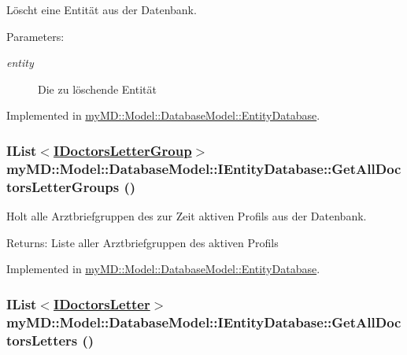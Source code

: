 L\"{o}scht eine Entit\"{a}t aus der Datenbank. 

\begin{Desc}
\item[Parameters:]
\begin{description}
\item[{\em entity}]Die zu l\"{o}schende Entit\"{a}t\end{description}
\end{Desc}


Implemented in \hyperlink{classmy_m_d_1_1_model_1_1_database_model_1_1_entity_database_1ec3022b27f9091440cb495f510d25b0}{my\-MD::Model::Database\-Model::Entity\-Database}.\hypertarget{interfacemy_m_d_1_1_model_1_1_database_model_1_1_i_entity_database_ebf03ac78145d306eed6f8bb7a92934f}{
\subsubsection[GetAllDoctorsLetterGroups]{\setlength{\rightskip}{0pt plus 5cm}IList$<$\hyperlink{interfacemy_m_d_1_1_model_interface_1_1_data_model_interface_1_1_i_doctors_letter_group}{IDoctors\-Letter\-Group}$>$ my\-MD::Model::Database\-Model::IEntity\-Database::Get\-All\-Doctors\-Letter\-Groups ()}}
\label{d3/da9/interfacemy_m_d_1_1_model_1_1_database_model_1_1_i_entity_database_ebf03ac78145d306eed6f8bb7a92934f}


Holt alle Arztbriefgruppen des zur Zeit aktiven Profils aus der Datenbank. 

\begin{Desc}
\item[Returns:]Liste aller Arztbriefgruppen des aktiven Profils\end{Desc}


Implemented in \hyperlink{classmy_m_d_1_1_model_1_1_database_model_1_1_entity_database_ebf03ac78145d306eed6f8bb7a92934f}{my\-MD::Model::Database\-Model::Entity\-Database}.\hypertarget{interfacemy_m_d_1_1_model_1_1_database_model_1_1_i_entity_database_d824e78a8274c2fc04719a66a7030fd7}{
\subsubsection[GetAllDoctorsLetters]{\setlength{\rightskip}{0pt plus 5cm}IList$<$\hyperlink{interfacemy_m_d_1_1_model_interface_1_1_data_model_interface_1_1_i_doctors_letter}{IDoctors\-Letter}$>$ my\-MD::Model::Database\-Model::IEntity\-Database::Get\-All\-Doctors\-Letters ()}}
\label{d3/da9/interfacemy_m_d_1_1_model_1_1_database_model_1_1_i_entity_database_d824e78a8274c2fc04719a66a7030fd7}


